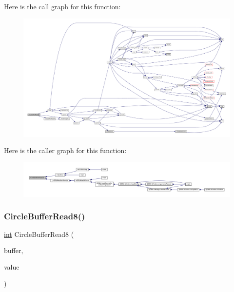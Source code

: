 Here is the call graph for this function\+:
\nopagebreak
\begin{figure}[H]
\begin{center}
\leavevmode
\includegraphics[width=350pt]{circle-buffer_8c_a3f1b62ccdf61258172c305dcb525e31c_cgraph}
\end{center}
\end{figure}
Here is the caller graph for this function\+:
\nopagebreak
\begin{figure}[H]
\begin{center}
\leavevmode
\includegraphics[width=350pt]{circle-buffer_8c_a3f1b62ccdf61258172c305dcb525e31c_icgraph}
\end{center}
\end{figure}
\mbox{\label{circle-buffer_8c_a715de2b8c3a6b466d1a2fd2f7efae286}} 
\subsubsection{\texorpdfstring{Circle\+Buffer\+Read8()}{CircleBufferRead8()}}
{\footnotesize\ttfamily \mbox{\hyperlink{ioapi_8h_a787fa3cf048117ba7123753c1e74fcd6}{int}} Circle\+Buffer\+Read8 (\begin{DoxyParamCaption}\item[{struct Circle\+Buffer $\ast$}]{buffer,  }\item[{int8\+\_\+t $\ast$}]{value }\end{DoxyParamCaption})}

